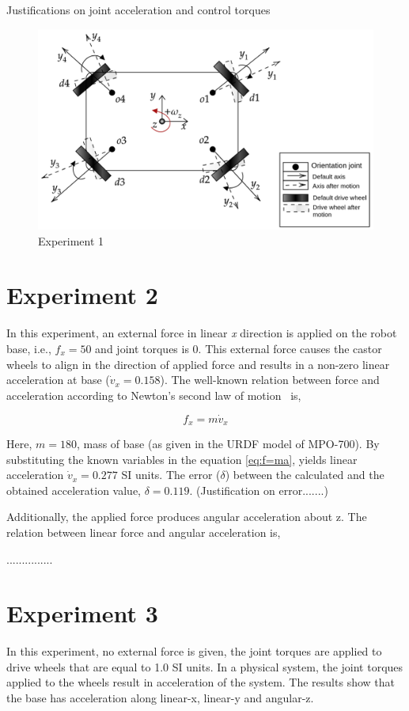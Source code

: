 {\color{red}Justifications on joint acceleration and control torques}

\begin{figure}[h!]
	\begin{center}
		\includegraphics[scale=0.35]{images/exp1_1.png}
	\end{center}
	\caption{Experiment 1}
\end{figure}

\newpage
\section{Experiment 2}
In this experiment, an external force in linear \textit{x} direction is applied on the robot base, i.e., $f_x = 50$ and joint torques is 0. This external force causes the castor wheels to align in the direction of applied force and results in a non-zero linear acceleration at base ($\dot{v}_x = 0.158$). The well-known relation between force and acceleration according to Newton's second law of motion~\cite{newton1833philosophiae} is,

\begin{equation}\label{eq:f=ma}
	f_x = m \dot{v}_x
\end{equation}

Here, $m = 180$, mass of base (as given in the URDF model of MPO-700). By substituting the known variables in the equation \ref{eq:f=ma}, yields linear acceleration $\dot{v}_x = 0.277$ SI units. The error ($\delta$) between the calculated and the obtained acceleration value, $\delta = 0.119$. (Justification on error.......)

Additionally, the applied force produces angular acceleration about z. The relation between linear force and angular acceleration is,

...............


\section{Experiment 3}
In this experiment, no external force is given, the joint torques are applied to drive wheels that are equal to 1.0 SI units. In a physical system, the joint torques applied to the wheels result in acceleration of the system. The results show that the base has acceleration along linear-x, linear-y and angular-z. 
